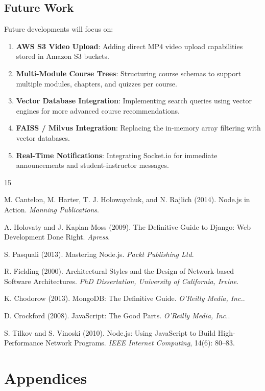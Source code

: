 \documentclass[12pt,a4paper]{report}
\begin{document}
\section{Future Work}
Future developments will focus on:
\begin{enumerate}
    \item \textbf{AWS S3 Video Upload}: Adding direct MP4 video upload capabilities stored in Amazon S3 buckets.
    \item \textbf{Multi-Module Course Trees}: Structuring course schemas to support multiple modules, chapters, and quizzes per course.
    \item \textbf{Vector Database Integration}: Implementing search queries using vector engines for more advanced course recommendations.
    \item \textbf{FAISS / Milvus Integration}: Replacing the in-memory array filtering with vector databases.
    \item \textbf{Real-Time Notifications}: Integrating Socket.io for immediate announcements and student-instructor messages.
\end{enumerate}

\begin{thebibliography}{15}

M. Cantelon, M. Harter, T. J. Holowaychuk, and N. Rajlich (2014). Node.js in Action. \textit{Manning Publications}.

A. Holovaty and J. Kaplan-Moss (2009). The Definitive Guide to Django: Web Development Done Right. \textit{Apress}.

S. Pasquali (2013). Mastering Node.js. \textit{Packt Publishing Ltd}.

R. Fielding (2000). Architectural Styles and the Design of Network-based Software Architectures. \textit{PhD Dissertation, University of California, Irvine}.

K. Chodorow (2013). MongoDB: The Definitive Guide. \textit{O'Reilly Media, Inc.}.

D. Crockford (2008). JavaScript: The Good Parts. \textit{O'Reilly Media, Inc.}.

S. Tilkov and S. Vinoski (2010). Node.js: Using JavaScript to Build High-Performance Network Programs. \textit{IEEE Internet Computing}, 14(6): 80--83.

\end{thebibliography}

\chapter{Appendices}
\end{document}

